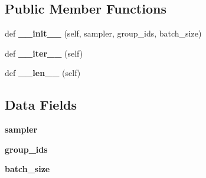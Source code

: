 \subsection*{Public Member Functions}
\begin{DoxyCompactItemize}
\item 
\mbox{\label{classgroup__by__aspect__ratio_1_1GroupedBatchSampler_a6588b3cedfec200edb8588fe56af273b}} 
def {\bfseries \+\_\+\+\_\+init\+\_\+\+\_\+} (self, sampler, group\+\_\+ids, batch\+\_\+size)
\item 
\mbox{\label{classgroup__by__aspect__ratio_1_1GroupedBatchSampler_a6f89791787d867c6d153ffdb9e508258}} 
def {\bfseries \+\_\+\+\_\+iter\+\_\+\+\_\+} (self)
\item 
\mbox{\label{classgroup__by__aspect__ratio_1_1GroupedBatchSampler_a1993f679bba181afd85806c16a76c40a}} 
def {\bfseries \+\_\+\+\_\+len\+\_\+\+\_\+} (self)
\end{DoxyCompactItemize}
\subsection*{Data Fields}
\begin{DoxyCompactItemize}
\item 
\mbox{\label{classgroup__by__aspect__ratio_1_1GroupedBatchSampler_a298cc43dbef08c05daa94ba6c5fc64bc}} 
{\bfseries sampler}
\item 
\mbox{\label{classgroup__by__aspect__ratio_1_1GroupedBatchSampler_a03cf514e21dfb3fc18204bca917c3ee4}} 
{\bfseries group\+\_\+ids}
\item 
\mbox{\label{classgroup__by__aspect__ratio_1_1GroupedBatchSampler_ae2378d96f4469acbd2bee7e27e64a94f}} 
{\bfseries batch\+\_\+size}
\end{DoxyCompactItemize}


